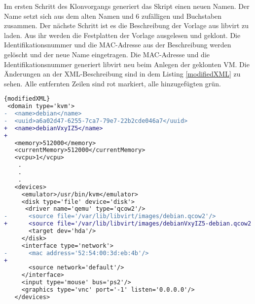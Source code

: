 Im ersten Schritt des Klonvorgangs generiert das Skript einen neuen Namen. Der Name setzt sich aus dem alten Namen und 6 zufälligen und Buchstaben zusammen. Der nächste Schritt ist es die Beschreibung der Vorlage aus libvirt zu laden. Aus ihr werden die Festplatten der Vorlage ausgelesen und geklont. Die Identifikationsnummer und die MAC-Adresse aus der Beschreibung werden gelöscht und der neue Name eingetragen. Die MAC-Adresse und die Identifikationsnummer generiert libvirt neu beim Anlegen der geklonten VM. Die Änderungen an der XML-Beschreibung sind in dem Listing \ref{modifiedXML} zu sehen. Alle entfernten Zeilen sind rot markiert, alle hinzugefügten grün.
\\
\begin{lstlisting}[caption=modifizierte XML-Beschreibung,language=diff,label=modifiedXML]{modifiedXML}
 <domain type='kvm'>
-  <name>debian</name>
-  <uuid>a6a02d47-6255-7ca7-79e7-22b2cde046a7</uuid>
+  <name>debianVxyIZ5</name>
+  
   <memory>512000</memory>
   <currentMemory>512000</currentMemory>
   <vcpu>1</vcpu>
    .
    .
    .
   <devices>
     <emulator>/usr/bin/kvm</emulator>
     <disk type='file' device='disk'>
      <driver name='qemu' type='qcow2'/>
-      <source file='/var/lib/libvirt/images/debian.qcow2'/>
+      <source file='/var/lib/libvirt/images/debianVxyIZ5-debian.qcow2'/>
       <target dev='hda'/>
     </disk>
     <interface type='network'>
-      <mac address='52:54:00:3d:eb:4b'/>
+      
       <source network='default'/>
     </interface>
     <input type='mouse' bus='ps2'/>
     <graphics type='vnc' port='-1' listen='0.0.0.0'/>
   </devices>
\end{lstlisting}

